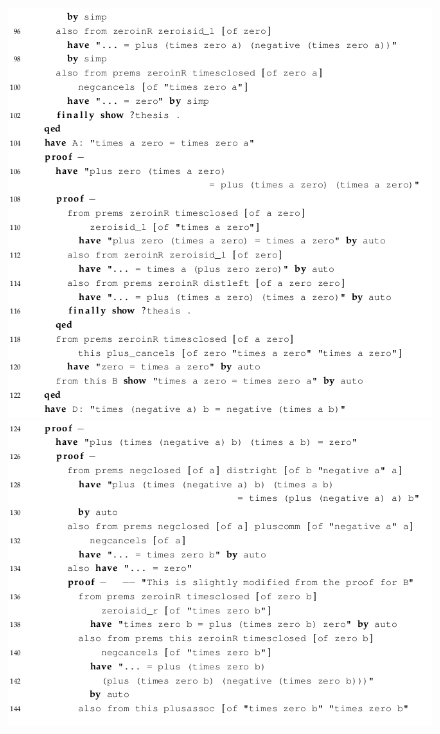 \begin{figure}[H]
\begin{center}
\includegraphics[scale=0.6]{Figures/Background/ringfull4.png}
\includegraphics[scale=0.6]{Figures/Background/ringfull5.png}
\end{center}
\end{figure}


